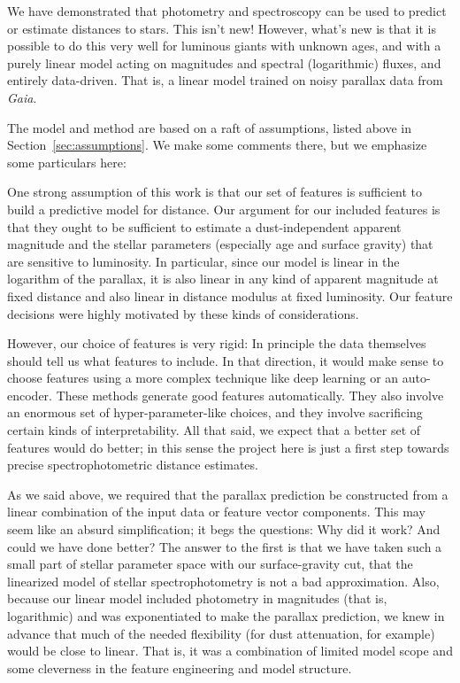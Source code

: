 \documentclass[modern]{aastex62}
\newcommand{\sectionname}{Section}
\newcommand{\project}[1]{\textsl{#1}}
\newcommand{\gaia}{\project{Gaia}}
\begin{document}
We have demonstrated that photometry and spectroscopy can be used to predict
or estimate distances to stars.
This isn't new!
However, what's new is that it is possible to do this very well for luminous giants
with unknown ages, and with a purely
linear model acting on magnitudes and spectral (logarithmic) fluxes, and entirely
data-driven.
That is, a linear model trained on noisy parallax data from \gaia.

The model and method are based on a raft of assumptions, listed above
in \sectionname~\ref{sec:assumptions}.
We make some comments there, but we emphasize some particulars here:

One strong assumption of this work is that our set of features is sufficient to
build a predictive model for distance.
Our argument for our included features is that they ought to be sufficient to
estimate a dust-independent apparent magnitude and the stellar parameters (especially
age and surface gravity) that are sensitive to luminosity.
In particular, since our model is linear in the logarithm of the parallax, it is
also linear in any kind of apparent magnitude at fixed distance and also linear
in distance modulus at fixed luminosity.
Our feature decisions were highly motivated by these kinds of considerations.

However, our choice of features is very rigid:
In principle the data themselves should tell us what features to include.
In that direction, it would make sense to choose features using a more complex
technique like deep learning or an auto-encoder.
These methods generate good features automatically.
They also involve an enormous set of hyper-parameter-like choices,
and they involve sacrificing certain kinds of interpretability.
All that said, we expect that a better set of features would do better; in this sense
the project here is just a first step towards precise spectrophotometric distance
estimates.

As we said above,
we required that the parallax prediction be constructed from a linear combination
of the input data or feature vector components.
This may seem like an absurd simplification; it begs the questions:
Why did it work? And could we have done better?
The answer to the first is that we have taken such a small part of stellar parameter
space with our surface-gravity cut, that the linearized model of stellar
spectrophotometry is not a bad approximation.
Also, because our linear model included photometry in magnitudes (that is, logarithmic)
and was exponentiated to make the parallax prediction, we knew in advance that much
of the needed flexibility (for dust attenuation, for example) would be close to
linear.
That is, it was a combination of limited model scope and some cleverness in the
feature engineering and model structure.
\end{document}
